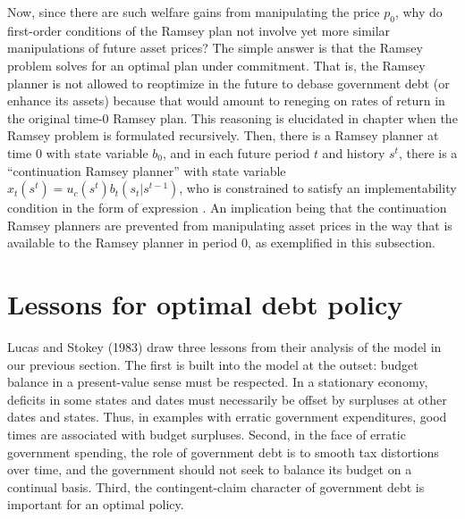 Now, since there are such welfare gains from manipulating the 
price $p_0$, why do first-order conditions  of the 
Ramsey plan not involve yet more similar manipulations of future 
asset prices?
The simple answer is that the Ramsey problem solves for an optimal
plan under commitment. That is, the Ramsey planner is not allowed
to reoptimize in the future to debase government debt (or enhance
its assets) because that would amount to reneging on rates of
return in the original time-$0$ Ramsey plan.
This reasoning is elucidated in 
chapter  when the Ramsey problem is formulated
recursively. Then, there is a Ramsey planner at time $0$ with 
state variable $b_0$, and in each future period $t$ and history
$s^t$, there is a ``continuation Ramsey planner'' with state
variable $x_t(s^t) = u_c(s^t) b_t(s_t | s^{t-1})$, who is 
constrained to satisfy an implementability condition in the form
of expression . An implication being that the
continuation Ramsey planners are prevented from manipulating 
asset prices in the way that is available to the Ramsey planner 
in period $0$, as exemplified in this subsection. 




 
\section{Lessons for optimal debt policy}\label{LS_lessons_debt}
Lucas and Stokey (1983)
draw three lessons from their analysis of the model in our previous section. The
first is built into the model at the outset: budget balance in a present-value
 sense must be respected. In a stationary economy,  deficits in some states and dates must
 necessarily be offset by  surpluses
at other dates and states. Thus, in  examples with erratic government expenditures,
good times are associated with budget surpluses. Second, in the face of
erratic government spending, the role of government debt is to smooth
tax distortions over time, and the government should not seek
to balance its budget on a continual basis. Third, the
contingent-claim character of government debt is important for an
optimal policy.

